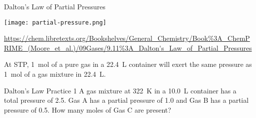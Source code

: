 \documentclass[handout]{beamer}
\begin{document}
\begin{frame}{Dalton's Law of Partial Pressures}
	\begin{center}
		\texttt{[image: partial-pressure.png]}

		\tiny{\url{https://chem.libretexts.org/Bookshelves/General_Chemistry/Book\%3A_ChemPRIME_(Moore_et_al.)/09Gases/9.11\%3A_Dalton's_Law_of_Partial_Pressures}}
	\end{center}

	\bigskip

	At STP, \SI{1}{\mole} of a pure gas in a \SI{22.4}{\liter} container
	will exert the same pressure as \SI{1}{\mole} of a gas mixture in
	\SI{22.4}{\liter}.
\end{frame}

\begin{frame}[t]{Dalton's Law Practice 1}
	A gas mixture at \SI{322}{\kelvin} in a \SI{10.0}{\liter} container
	has a total pressure of \SI{2.5}{\atm}. Gas A has a partial pressure of
	\SI{1.0}{\atm} and Gas B has a partial pressure of \SI{0.5}{\atm}. How
	many moles of Gas C are present?

	\vspace{15em}

\end{frame}
\end{document}
